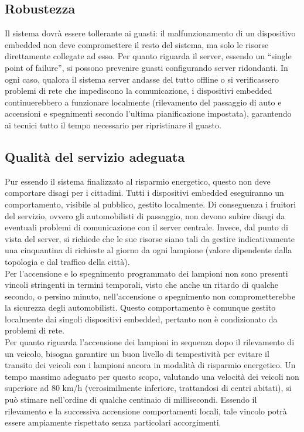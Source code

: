 \subsection{Robustezza}
Il sistema dovrà essere tollerante ai guasti: il malfunzionamento di un dispositivo embedded non deve compromettere il resto del sistema, ma solo le risorse direttamente collegate ad esso.
Per quanto riguarda il server, essendo un ``single point of failure'', si possono prevenire guasti configurando server ridondanti.
In ogni caso, qualora il sistema server andasse del tutto offline o si verificassero problemi di rete che impediscono la comunicazione, i dispositivi embedded continuerebbero a funzionare localmente (rilevamento del passaggio di auto e accensioni e spegnimenti secondo l'ultima pianificazione impostata), garantendo ai tecnici tutto il tempo necessario per ripristinare il guasto.

\subsection{Qualità del servizio adeguata}
Pur essendo il sistema finalizzato al risparmio energetico, questo non deve comportare disagi per i cittadini.
Tutti i dispositivi embedded eseguiranno un comportamento, visibile al pubblico, gestito localmente.
Di conseguenza i fruitori del servizio, ovvero gli automobilisti di passaggio, non devono subire disagi da eventuali problemi di comunicazione con il server centrale.
Invece, dal punto di vista del server, si richiede che le sue risorse siano tali da gestire indicativamente una cinquantina di richieste al giorno da ogni lampione (valore dipendente dalla topologia e dal traffico della città).
\\Per l'accensione e lo spegnimento programmato dei lampioni non sono presenti vincoli stringenti in termini temporali, visto che anche un ritardo di qualche secondo, o persino minuto, nell'accensione o spegnimento non comprometterebbe la sicurezza degli automobilisti.
Questo comportamento è comunque gestito localmente dai singoli dispositivi embedded, pertanto non è condizionato da problemi di rete.
\\Per quanto riguarda l'accensione dei lampioni in sequenza dopo il rilevamento di un veicolo, bisogna garantire un buon livello di tempestività per evitare il transito dei veicoli con i lampioni ancora in modalità di risparmio energetico.
Un tempo massimo adeguato per questo scopo, valutando una velocità dei veicoli non superiore ad 80 km/h (verosimilmente inferiore, trattandosi di centri abitati), si può stimare nell'ordine di qualche centinaio di millisecondi.
Essendo il rilevamento e la successiva accensione comportamenti locali, tale vincolo potrà essere ampiamente rispettato senza particolari accorgimenti.

